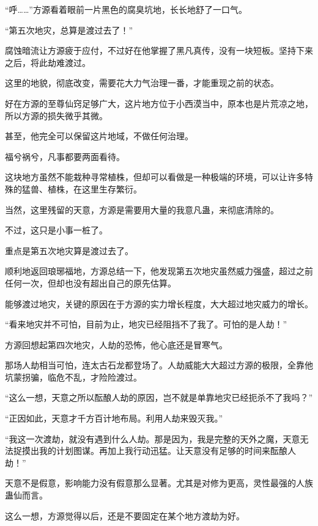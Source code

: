 
\begin{this_body}

“呼……”方源看着眼前一片黑色的腐臭坑地，长长地舒了一口气。

“第五次地灾，总算是渡过去了！”

腐蚀暗流让方源疲于应付，不过好在他掌握了黑凡真传，没有一块短板。坚持下来之后，将此劫难渡过。

这里的地貌，彻底改变，需要花大力气治理一番，才能重现之前的状态。

好在方源的至尊仙窍足够广大，这片地方位于小西漠当中，原本也是片荒凉之地，所以方源的损失微乎其微。

甚至，他完全可以保留这片地域，不做任何治理。

福兮祸兮，凡事都要两面看待。

这块地方虽然不能栽种寻常植株，但却可以看做是一种极端的环境，可以让许多特殊的猛兽、植株，在这里生存繁衍。

当然，这里残留的天意，方源是需要用大量的我意凡蛊，来彻底清除的。

不过，这只是小事一桩了。

重点是第五次地灾算是渡过去了。

顺利地返回琅琊福地，方源总结一下，他发现第五次地灾虽然威力强盛，超过之前任何一次，但却也没有超出自己的原先估算。

能够渡过地灾，关键的原因在于方源的实力增长程度，大大超过地灾威力的增长。

“看来地灾并不可怕，目前为止，地灾已经阻挡不了我了。可怕的是人劫！”

方源回想起第四次地灾，人劫的恐怖，他心底还是冒寒气。

那场人劫相当可怕，连太古石龙都登场了。人劫威能大大超过方源的极限，全靠他坑蒙拐骗，临危不乱，才险险渡过。

“这么一想，天意之所以酝酿人劫的原因，岂不就是单靠地灾已经扼杀不了我吗？”

“正因如此，天意才千方百计地布局。利用人劫来毁灭我。”

“我这一次渡劫，就没有遇到什么人劫。那是因为，我是完整的天外之魔，天意无法捉摸出我的计划图谋。再加上我行动迅猛。让天意没有足够的时间来酝酿人劫！”

天意不是假意，影响能力没有假意那么显著。尤其是对修为更高，灵性最强的人族蛊仙而言。

这么一想，方源觉得以后，还是不要固定在某个地方渡劫为好。


\end{this_body}
